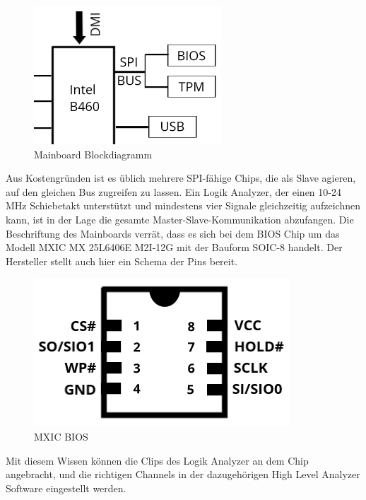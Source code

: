 \documentclass[conference]{IEEEtran}
\begin{document}
\begin{figure}[h!]
	\centering
	\includegraphics[width=0.8\linewidth]{SPI}
	\caption{Mainboard Blockdiagramm \cite{GIGABYTETECHNOLOGYCO.LTD.}}
	\label{fig:SPI}
\end{figure}

Aus Kostengründen ist es üblich mehrere SPI-fähige Chips, die als Slave agieren, auf den gleichen Bus zugreifen zu lassen. Ein Logik Analyzer, der einen 10-24 MHz Schiebetakt unterstützt und mindestens vier Signale gleichzeitig aufzeichnen kann, ist in der Lage die gesamte Master-Slave-Kommunikation abzufangen.
Die Beschriftung des Mainboards verrät, dass es sich bei dem BIOS Chip um das Modell MXIC MX 25L6406E M2I-12G mit der Bauform SOIC-8 handelt. Der Hersteller stellt auch hier ein Schema der Pins bereit.

\begin{figure}[h!]
	\centering
	\includegraphics[width=0.9\linewidth]{BIOS}
	\caption{MXIC BIOS \cite{MacronixInternationalCo.LTD..2010}}
	\label{fig:bios}
\end{figure}

Mit diesem Wissen können die Clips des Logik Analyzer an dem Chip angebracht, und die richtigen Channels in der dazugehörigen High Level Analyzer Software eingestellt werden.
\end{document}
